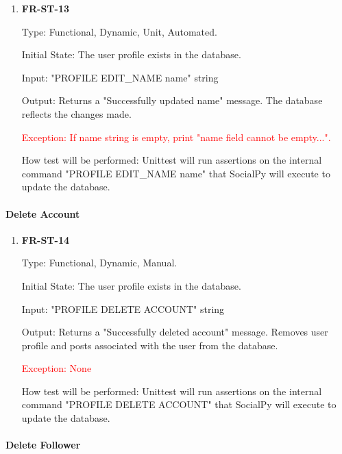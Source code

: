 \documentclass[12pt, titlepage]{article}
\begin{document}
\begin{enumerate}

\item{\textbf{FR-ST-13}}

Type: Functional, Dynamic, Unit, Automated.
					
Initial State: The user profile exists in the database.
					
Input: "PROFILE EDIT\_NAME name" string
					
Output: Returns a "Successfully updated name" message. The database reflects the changes made. 

\textcolor{red}{Exception: If name string is empty, print "name field cannot be empty...".}
					
How test will be performed: Unittest will run assertions on the internal command "PROFILE EDIT\_NAME name" that SocialPy will execute to update the database.
\end{enumerate}

\paragraph{Delete Account}

\begin{enumerate}

\item{\textbf{FR-ST-14}}

Type: Functional, Dynamic, Manual.
					
Initial State: The user profile exists in the database.
					
Input: "PROFILE DELETE ACCOUNT" string
					
Output: Returns a "Successfully deleted account" message. Removes user profile and posts associated with the user from the database.

\textcolor{red}{Exception: None}
					
How test will be performed: Unittest will run assertions on the internal command "PROFILE DELETE ACCOUNT" that SocialPy will execute to update the database.
\end{enumerate}

\paragraph{Delete Follower}
\end{document}

